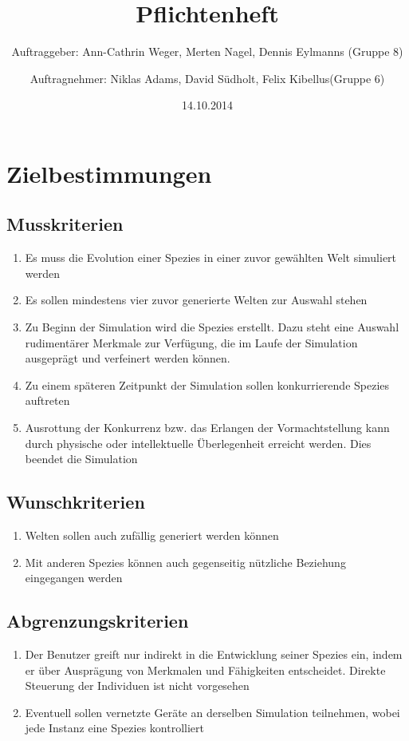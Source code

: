 \documentclass[a4paper, 10pt]{article}
\title{Pflichtenheft}
\author{Auftraggeber: Ann-Cathrin Weger, Merten Nagel, Dennis Eylmanns (Gruppe 8) \and
Auftragnehmer: Niklas Adams, David Südholt, Felix Kibellus(Gruppe 6)}
\date{14.10.2014}
\begin{document}
	\maketitle

\section{Zielbestimmungen}
\subsection{Musskriterien}
\begin{enumerate}
\item
Es muss die Evolution einer Spezies in einer zuvor gewählten Welt simuliert werden
\item
Es sollen mindestens vier zuvor generierte Welten zur Auswahl stehen
\item
Zu Beginn der Simulation wird die Spezies erstellt. Dazu steht eine Auswahl rudimentärer Merkmale zur Verfügung, die im Laufe der Simulation ausgeprägt und verfeinert werden können.
\item
Zu einem späteren Zeitpunkt der Simulation sollen konkurrierende Spezies auftreten
\item
Ausrottung der Konkurrenz bzw. das Erlangen der Vormachtstellung kann durch physische oder intellektuelle Überlegenheit erreicht werden. Dies beendet die Simulation
\end{enumerate}

\subsection{Wunschkriterien}
\begin{enumerate}
\item
Welten sollen auch zufällig generiert werden können
\item
Mit anderen Spezies können auch gegenseitig nützliche Beziehung eingegangen werden
\end{enumerate} 

\subsection{Abgrenzungskriterien}
\begin{enumerate}
\item
Der Benutzer greift nur indirekt in die Entwicklung seiner Spezies ein, indem er über Ausprägung von Merkmalen und Fähigkeiten entscheidet. Direkte Steuerung der Individuen ist nicht vorgesehen
\item
Eventuell sollen vernetzte Geräte an derselben Simulation teilnehmen, wobei jede Instanz eine Spezies kontrolliert
\end{enumerate}
\end{document}
